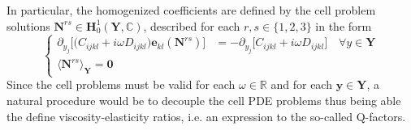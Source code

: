 In particular, the homogenized coefficients are defined by the cell problem solutions $\mathbf{N}^{rs} \in \mathbf{H}^1_{0}(\mathbf{Y}, \mathbb{C})$, described for each $r,s \in \{1,2,3\}$ in the form
\begin{equation*}
    \left \{
    \begin{array}{cc}
         \partial_{y_j} \big[ \big( C_{ijkl} + i\omega D_{ijkl} \big) \mathbf{e}_{kl}(\mathbf{N}^{rs}) \big] &= - \partial_{y_j} \big[ C_{ijkl} + i\omega D_{ijkl} \big] \quad \forall y \in \mathbf{Y} \\
        \big \langle \mathbf{N}^{rs} \big \rangle_{\mathbf{Y}}  = \mathbf{0} & 
    \end{array}
    \right.
\end{equation*}
Since the cell problems must be valid for each $\omega \in \mathbb{R}$ and for each $\mathbf{y} \in \mathbf{Y}$, a natural procedure would be to decouple the cell PDE problems thus being able the define viscosity-elasticity ratios, i.e. an expression to the so-called Q-factors.

